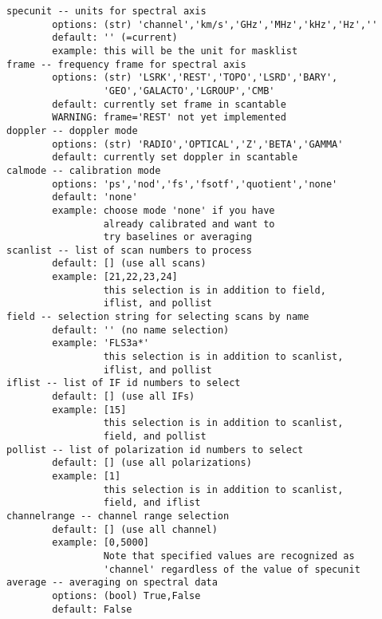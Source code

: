 \begin{verbatim}
specunit -- units for spectral axis
        options: (str) 'channel','km/s','GHz','MHz','kHz','Hz',''
        default: '' (=current)
        example: this will be the unit for masklist
frame -- frequency frame for spectral axis
        options: (str) 'LSRK','REST','TOPO','LSRD','BARY',
                 'GEO','GALACTO','LGROUP','CMB'
        default: currently set frame in scantable
        WARNING: frame='REST' not yet implemented
doppler -- doppler mode
        options: (str) 'RADIO','OPTICAL','Z','BETA','GAMMA'
        default: currently set doppler in scantable
calmode -- calibration mode
        options: 'ps','nod','fs','fsotf','quotient','none'
        default: 'none'
        example: choose mode 'none' if you have
                 already calibrated and want to
                 try baselines or averaging
scanlist -- list of scan numbers to process
        default: [] (use all scans)
        example: [21,22,23,24]
                 this selection is in addition to field,
                 iflist, and pollist
field -- selection string for selecting scans by name
        default: '' (no name selection)
        example: 'FLS3a*'
                 this selection is in addition to scanlist,
                 iflist, and pollist
iflist -- list of IF id numbers to select
        default: [] (use all IFs)
        example: [15]
                 this selection is in addition to scanlist,
                 field, and pollist
pollist -- list of polarization id numbers to select
        default: [] (use all polarizations)
        example: [1]
                 this selection is in addition to scanlist,
                 field, and iflist
channelrange -- channel range selection
        default: [] (use all channel)
        example: [0,5000]
                 Note that specified values are recognized as 
                 'channel' regardless of the value of specunit 
average -- averaging on spectral data 
        options: (bool) True,False
        default: False


\end{verbatim}
